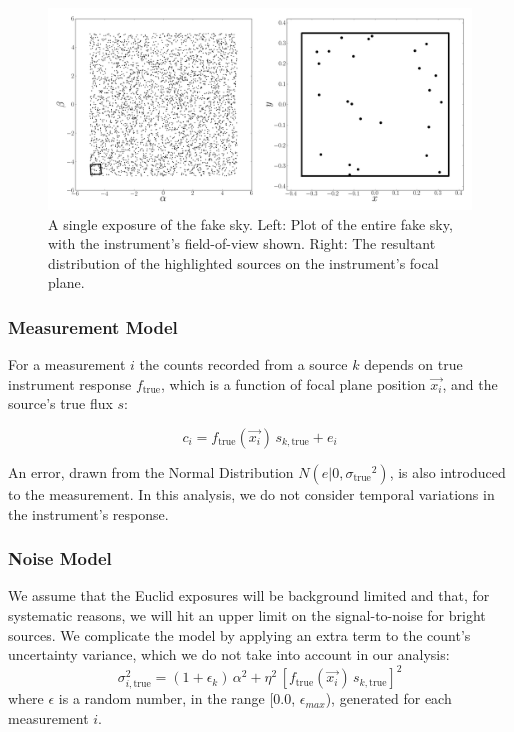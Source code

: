 \documentclass[manuscript]{aastex}
\newcommand{\true}{\mathrm{true}}
\begin{document}
\begin{figure}[ht]
\begin{center}
\includegraphics[width=\textwidth]{camera_image.png}
\end{center}
\caption{A single exposure of the fake sky. Left: Plot of the entire fake sky, with the instrument's field-of-view shown. Right: The resultant distribution of the highlighted sources on the instrument's focal plane. \label{fig:camera}}
\end{figure}

\subsubsection{Measurement Model}
For a measurement $i$ the counts recorded from a source $k$ depends on true instrument response $f_{\true}$, which is a function of focal plane position $\vec{x_i}$, and the source's true flux $s$: 

\begin{displaymath}
c_i = f_{\true}(\vec{x_i}) \, s_{k, \true} + e_{i}
\end{displaymath}

\noindent{}An error, drawn from the Normal Distribution $N(e|0,{\sigma_\true}^2)$, is also introduced to the measurement. In this analysis, we do not consider temporal variations in the instrument's response. 

\subsubsection{Noise Model}
\label{sec:noise_model}
We assume that the Euclid exposures will be background limited and that, for systematic reasons, we will hit an upper limit on the signal-to-noise for bright sources. We complicate the model by applying an extra term to the count's uncertainty variance, which we do not take into account in our analysis:
\begin{displaymath}
\sigma_{i, \true}^{2} = (1 + \epsilon_k) \, \alpha^{2} + \eta^{2}\, [ f_\true(\vec{x_i}) \, s_{k, \true} ]^2
\end{displaymath}
\noindent{}where $\epsilon$ is a random number, in the range [0.0, $\epsilon_{max}$), generated for each measurement $i$. 
\end{document}
